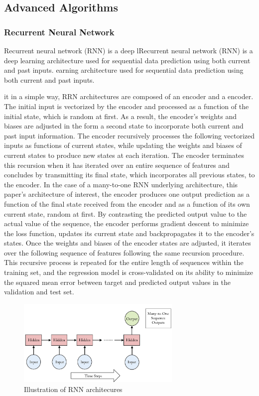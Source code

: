 \documentclass{article}
\begin{document}
\subsection{Advanced Algorithms}

\subsubsection{Recurrent Neural Network}
Recurrent neural network (RNN) is a deep lRecurrent neural network 
(RNN) is a deep learning architecture used for sequential data prediction
using both current and past inputs. earning architecture used for sequential 
data prediction using both current and past inputs. 

it in a simple way, RRN architectures are composed of an encoder and a encoder. The initial input is vectorized by the encoder and processed as a function of the initial state, which is random at first. As a result, the encoder's weights and biases are adjusted in the form a second state to incorporate both current and past input information. The encoder recursively processes the following vectorized inputs as functions of current states, while updating the weights and biases of current states to produce new states at each iteration. The encoder terminates this recursion when it has iterated over an entire sequence of features and concludes by transmitting its final state, which incorporates all previous states, to the encoder. In the case of a many-to-one RNN underlying architecture, this paper's architecture of interest, the encoder produces one output prediction as a function of the final state received from the encoder and as a function of its own current state, random at first. By contrasting the predicted output value to the actual value of the sequence, the encoder performs gradient descent to minimize the loss function, updates its current state and backpropagates it to the encoder's states. Once the weights and biases of the encoder states are adjusted, it iterates over the following sequence of features following the same recursion procedure. This recursive process is repeated for the entire length of sequences within the training set, and the regression model is cross-validated on its ability to minimize the squared mean error between target and predicted output values in the validation and test set. 
\begin{figure}
    \caption{Illustration of RNN architecures}
    \includegraphics[width=0.7\textwidth]{images/2023-03-17-16-42-13.png}
\end{figure}
\end{document}
